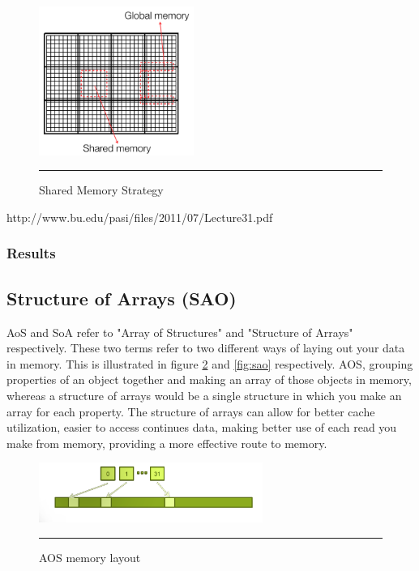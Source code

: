 \begin{figure}[htbp]
	\centering
		\includegraphics[width=0.45\textwidth]{Figures/shared.png}
		\rule{35em}{0.2pt}
	\caption[Shared Memory Strategy]{Shared Memory Strategy }
	\label{fig:shared}
\end{figure}

http://www.bu.edu/pasi/files/2011/07/Lecture31.pdf


\subsubsection{Results}


\subsection{Structure of Arrays (SAO)}


AoS and SoA refer to "Array of Structures" and "Structure of Arrays" respectively. These two terms refer to two different ways of laying out your data in memory. This is illustrated in figure \ref{fig:aos} and \ref{fig:sao} respectively. AOS, grouping properties of an object together and making an array of those objects in memory, whereas a structure of arrays would be a single structure in which you make an array for each property. The structure of arrays can allow for better cache utilization, easier to access continues data, making better use of each read you make from memory, providing a more effective route to memory. 

\begin{figure}[htbp]
	\centering
		\includegraphics[width=0.65\textwidth]{Figures/aos.png}
		\rule{35em}{0.2pt}
	\caption[Array of structures (AOS)]{AOS memory layout }
	\label{fig:aos}
\end{figure}


